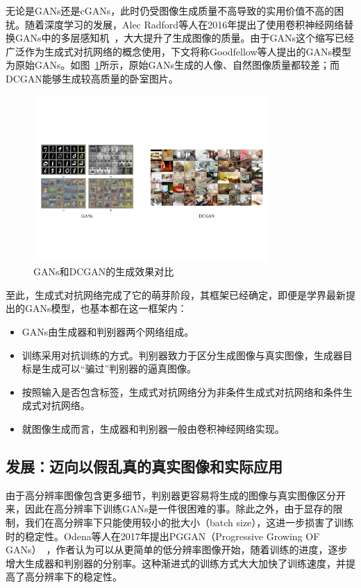 无论是GANs还是cGANs，此时仍受图像生成质量不高导致的实用价值不高的困扰。随着深度学习的发展，Alec Radford等人在2016年提出了使用卷积神经网络替换GANs中的多层感知机~\cite{DCGAN}，大大提升了生成图像的质量。由于GANs这个缩写已经广泛作为生成式对抗网络的概念使用，下文将称Goodfellow等人提出的GANs模型为原始GANs。如图~\ref{fig:GAN-DCGAN}所示，原始GANs生成的人像、自然图像质量都较差；而DCGAN能够生成较高质量的卧室图片。

\begin{figure}
    \centering
    \includegraphics[width=0.8\textwidth]{figures/GAN-DCGAN.pdf}
    \caption{GANs和DCGAN的生成效果对比}
    \label{fig:GAN-DCGAN}
\end{figure}

至此，生成式对抗网络完成了它的萌芽阶段，其框架已经确定，即便是学界最新提出的GANs模型，也基本都在这一框架内：

\begin{itemize}
\item GANs由生成器和判别器两个网络组成。
\item 训练采用对抗训练的方式。判别器致力于区分生成图像与真实图像，生成器目标是生成可以“骗过”判别器的逼真图像。
\item 按照输入是否包含标签，生成式对抗网络分为非条件生成式对抗网络和条件生成式对抗网络。
\item 就图像生成而言，生成器和判别器一般由卷积神经网络实现。
\end{itemize}

\subsection{发展：迈向以假乱真的真实图像和实际应用}
由于高分辨率图像包含更多细节，判别器更容易将生成的图像与真实图像区分开来，因此在高分辨率下训练GANs是一件很困难的事。除此之外，由于显存的限制，我们在高分辨率下只能使用较小的批大小（batch size），这进一步损害了训练时的稳定性。Odena等人在2017年提出PGGAN（Progressive Growing OF GANs）~\cite{PGGAN}，作者认为可以从更简单的低分辨率图像开始，随着训练的进度，逐步增大生成器和判别器的分别率。这种渐进式的训练方式大大加快了训练速度，并提高了高分辨率下的稳定性。

